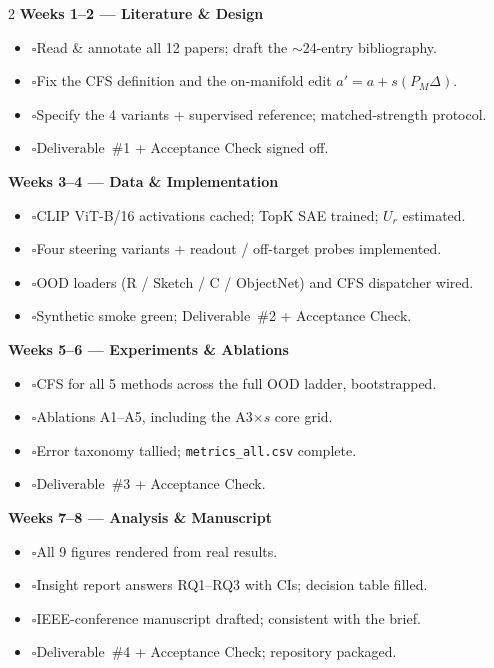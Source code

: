 \documentclass[11pt]{article}
\newcommand{\cbox}{$\square$\;}
\begin{document}
\begin{multicols}{2}
\textbf{Weeks 1--2 --- Literature \& Design}
\begin{itemize}[leftmargin=1.4em,label={},itemsep=0pt]
  \item \cbox Read \& annotate all 12 papers; draft the $\sim$24-entry bibliography.
  \item \cbox Fix the CFS definition and the on-manifold edit $a'=a+s(P_M\Delta)$.
  \item \cbox Specify the 4 variants + supervised reference; matched-strength protocol.
  \item \cbox Deliverable~\#1 + Acceptance Check signed off.
\end{itemize}

\textbf{Weeks 3--4 --- Data \& Implementation}
\begin{itemize}[leftmargin=1.4em,label={},itemsep=0pt]
  \item \cbox CLIP ViT-B/16 activations cached; TopK SAE trained; $U_r$ estimated.
  \item \cbox Four steering variants + readout / off-target probes implemented.
  \item \cbox OOD loaders (R / Sketch / C / ObjectNet) and CFS dispatcher wired.
  \item \cbox Synthetic smoke green; Deliverable~\#2 + Acceptance Check.
\end{itemize}

\columnbreak

\textbf{Weeks 5--6 --- Experiments \& Ablations}
\begin{itemize}[leftmargin=1.4em,label={},itemsep=0pt]
  \item \cbox CFS for all 5 methods across the full OOD ladder, bootstrapped.
  \item \cbox Ablations A1--A5, including the A3$\times s$ core grid.
  \item \cbox Error taxonomy tallied; \texttt{metrics\_all.csv} complete.
  \item \cbox Deliverable~\#3 + Acceptance Check.
\end{itemize}

\textbf{Weeks 7--8 --- Analysis \& Manuscript}
\begin{itemize}[leftmargin=1.4em,label={},itemsep=0pt]
  \item \cbox All 9 figures rendered from real results.
  \item \cbox Insight report answers RQ1--RQ3 with CIs; decision table filled.
  \item \cbox IEEE-conference manuscript drafted; consistent with the brief.
  \item \cbox Deliverable~\#4 + Acceptance Check; repository packaged.
\end{itemize}
\end{multicols}
\end{document}
